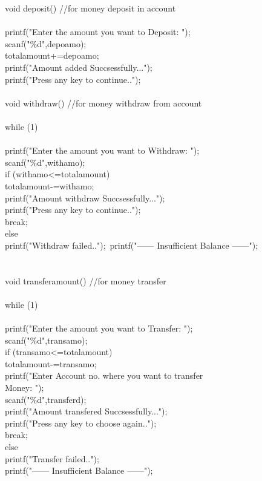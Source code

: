 \documentclass[12pt,a4 paper]{article}
\begin{document}
void deposit()               //for money deposit in account\\ 
{\\
    printf("Enter the amount you want to Deposit: ");\\
    scanf("\%d",depoamo);  \\
    totalamount+=depoamo;\\
    printf("Amount added Succsessfully...");\\
    printf("Press any key to continue..");\\
}\\
void withdraw()               //for money withdraw from account\\
{\\
  while (1)\\
  {\\
  
    printf("Enter the amount you want to Withdraw: ");\\
    scanf("\%d",withamo);\\
      if (withamo<=totalamount){\\
        totalamount-=withamo;\\
        printf("Amount withdraw Succsessfully...");\\
        printf("Press any key to continue..");\\
        break;}\\
      else{\\
        printf("Withdraw failed..");\
        printf("------ Insufficient Balance ------");}\\
  }\\
}\\
void transferamount()          //for money transfer\\
{\\
     
    while (1)\\
    {\\
      printf("Enter the amount you want to Transfer: ");\\
      scanf("\%d",transamo);  \\
      if (transamo<=totalamount){\\
        totalamount-=transamo;\\
        printf("Enter Account no. where you want to transfer\\ Money: ");\\
        scanf("\%d",transferd);\\
        printf("Amount transfered Succsessfully...");\\
        printf("Press any key to choose again..");\\
        break;}\\
      else{\\
        printf("Transfer failed..");\\
        printf("------ Insufficient Balance ------");}\\
    }\\
}\\
\end{document}
